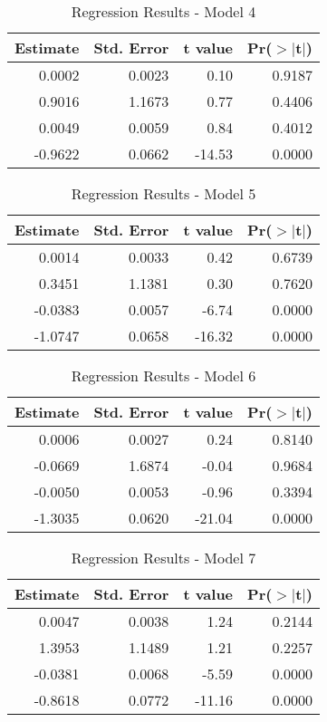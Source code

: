 \begin{table}[ht]
\centering
\begin{tabular}{rrrr}
  \hline
Estimate & Std. Error & t value & Pr($>$$|$t$|$) \\ 
  \hline
0.0002 & 0.0023 & 0.10 & 0.9187 \\ 
  0.9016 & 1.1673 & 0.77 & 0.4406 \\ 
  0.0049 & 0.0059 & 0.84 & 0.4012 \\ 
  -0.9622 & 0.0662 & -14.53 & 0.0000 \\ 
   \hline
\end{tabular}
\caption{Regression Results - Model 4} 
\end{table}
\begin{table}[ht]
\centering
\begin{tabular}{rrrr}
  \hline
Estimate & Std. Error & t value & Pr($>$$|$t$|$) \\ 
  \hline
0.0014 & 0.0033 & 0.42 & 0.6739 \\ 
  0.3451 & 1.1381 & 0.30 & 0.7620 \\ 
  -0.0383 & 0.0057 & -6.74 & 0.0000 \\ 
  -1.0747 & 0.0658 & -16.32 & 0.0000 \\ 
   \hline
\end{tabular}
\caption{Regression Results - Model 5} 
\end{table}
\begin{table}[ht]
\centering
\begin{tabular}{rrrr}
  \hline
Estimate & Std. Error & t value & Pr($>$$|$t$|$) \\ 
  \hline
0.0006 & 0.0027 & 0.24 & 0.8140 \\ 
  -0.0669 & 1.6874 & -0.04 & 0.9684 \\ 
  -0.0050 & 0.0053 & -0.96 & 0.3394 \\ 
  -1.3035 & 0.0620 & -21.04 & 0.0000 \\ 
   \hline
\end{tabular}
\caption{Regression Results - Model 6} 
\end{table}
\begin{table}[ht]
\centering
\begin{tabular}{rrrr}
  \hline
Estimate & Std. Error & t value & Pr($>$$|$t$|$) \\ 
  \hline
0.0047 & 0.0038 & 1.24 & 0.2144 \\ 
  1.3953 & 1.1489 & 1.21 & 0.2257 \\ 
  -0.0381 & 0.0068 & -5.59 & 0.0000 \\ 
  -0.8618 & 0.0772 & -11.16 & 0.0000 \\ 
   \hline
\end{tabular}
\caption{Regression Results - Model 7} 
\end{table}
